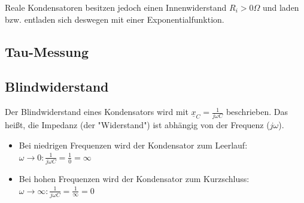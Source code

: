 \begin{center}
\end{center}

Reale Kondensatoren besitzen jedoch einen Innenwiderstand $R_i > 0 \Omega$ und laden bzw. entladen sich deswegen mit einer Exponentialfunktion.

\begin{center}
\end{center}

\newpage

\subsection{Tau-Messung}



\subsection{Blindwiderstand}
Der Blindwiderstand eines Kondensators wird mit $\underline{x}_C=\frac{1}{j\omega C}$ beschrieben. Das heißt, die Impedanz (der "Widerstand") ist abhängig von der Frequenz ($j\omega$).
\begin{itemize}
    \item Bei niedrigen Frequenzen wird der Kondensator zum Leerlauf:\\
    $\omega \rightarrow 0: \frac{1}{j\omega C} = \frac{1}{0} = \infty$

    \item Bei hohen Frequenzen wird der Kondensator zum Kurzschluss:\\
    $\omega \rightarrow \infty: \frac{1}{j\omega C} = \frac{1}{\infty} = 0$
\end{itemize}


